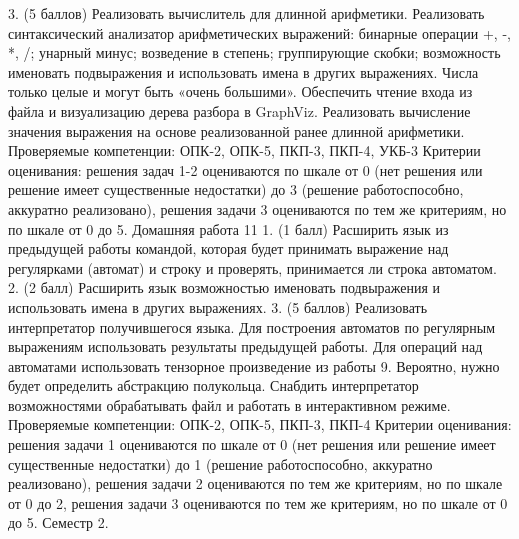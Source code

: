     3. (5 баллов) Реализовать вычислитель для длинной арифметики. Реализовать синтаксический анализатор арифметических выражений: бинарные операции +, -, *, /; унарный минус; возведение в степень; группирующие скобки; возможность именовать подвыражения и использовать имена в других выражениях. Числа только целые и могут быть «очень большими». Обеспечить чтение входа из файла и визуализацию дерева разбора в GraphViz. Реализовать вычисление значения выражения на основе реализованной ранее длинной арифметики.
Проверяемые компетенции: ОПК-2, ОПК-5, ПКП-3, ПКП-4, УКБ-3
Критерии оценивания: решения задач 1-2 оцениваются по шкале от 0 (нет решения или решение имеет существенные недостатки) до 3 (решение работоспособно, аккуратно реализовано), решения задачи 3 оцениваются по тем же критериям, но по шкале от 0 до 5.
Домашняя работа 11 
    1. (1 балл) Расширить язык из предыдущей работы командой, которая будет принимать выражение над регулярками (автомат) и строку и проверять, принимается ли строка автоматом.
    2. (2 балл) Расширить язык возможностью именовать подвыражения и использовать имена в других выражениях. 
    3. (5 баллов) Реализовать интерпретатор получившегося языка. Для построения автоматов по регулярным выражениям использовать результаты предыдущей работы. Для операций над автоматами использовать тензорное произведение из работы 9. Вероятно, нужно будет определить абстракцию полукольца. Снабдить интерпретатор возможностями обрабатывать файл и работать в интерактивном режиме.   
Проверяемые компетенции: ОПК-2, ОПК-5, ПКП-3, ПКП-4
Критерии оценивания: решения задачи 1 оцениваются по шкале от 0 (нет решения или решение имеет существенные недостатки) до 1 (решение работоспособно, аккуратно реализовано), решения задачи 2 оцениваются по тем же критериям, но по шкале от 0 до 2, решения задачи 3 оцениваются по тем же критериям, но по шкале от 0 до 5.
Семестр 2.

